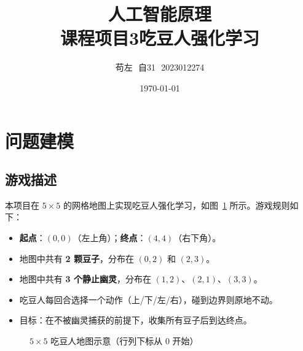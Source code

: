 \documentclass[12pt,a4paper]{ctexart}
\title{\textbf{人工智能原理\\课程项目3\quad 吃豆人强化学习}}
\author{苟左\,\, 自31\,\, 2023012274}
\date{\today}
\begin{document}
\maketitle

\section{问题建模}

\subsection{游戏描述}

本项目在 $5\times 5$ 的网格地图上实现吃豆人强化学习，如图~\ref{fig:map} 所示。游戏规则如下：
\begin{itemize}
    \item \textbf{起点}：$(0,0)$（左上角）；\textbf{终点}：$(4,4)$（右下角）。
    \item 地图中共有 \textbf{2 颗豆子}，分布在 $(0,2)$ 和 $(2,3)$。
    \item 地图中共有 \textbf{3 个静止幽灵}，分布在 $(1,2)$、$(2,1)$、$(3,3)$。
    \item 吃豆人每回合选择一个动作（上/下/左/右），碰到边界则原地不动。
    \item 目标：在不被幽灵捕获的前提下，收集所有豆子后到达终点。
\end{itemize}

\begin{figure}[H]
    \centering
    \caption{$5\times 5$ 吃豆人地图示意（行列下标从 0 开始）}
    \label{fig:map}
\end{figure}
\end{document}
